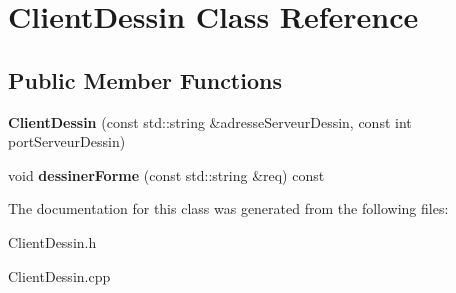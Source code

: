 \hypertarget{class_client_dessin}{}\section{Client\+Dessin Class Reference}
\label{class_client_dessin}
\subsection*{Public Member Functions}
\begin{DoxyCompactItemize}
\item 
\mbox{\label{class_client_dessin_a6e97889461e6ec50ae410d53ab38714e}} 
{\bfseries Client\+Dessin} (const std\+::string \&adresse\+Serveur\+Dessin, const int port\+Serveur\+Dessin)
\item 
\mbox{\label{class_client_dessin_a0d0f736cc555743f3a7b2e83368c94a8}} 
void {\bfseries dessiner\+Forme} (const std\+::string \&req) const
\end{DoxyCompactItemize}


The documentation for this class was generated from the following files\+:\begin{DoxyCompactItemize}
\item 
Client\+Dessin.\+h\item 
Client\+Dessin.\+cpp\end{DoxyCompactItemize}
